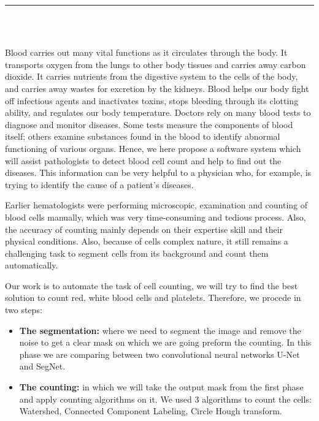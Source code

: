 \pagestyle{myfancy}


\setcounter{page}{1}

\begin{center}
    {\color{Black} \rule{6.2in}{1.4mm} }\\
    \vspace{0.1in}
    \scshape{\fontsize{34}{46}{\bfseries{\color{Black}{Introduction}}
    }}
    \\
    
    \vspace{0.5in}
\end{center}
\hspace*{0.16in}

Blood carries out many vital functions as it circulates through the body. It transports oxygen from the lungs to other body tissues and carries away carbon dioxide. It carries nutrients from the digestive system to the cells of the body, and carries away wastes for excretion by the kidneys. Blood helps our body fight off infectious agents and inactivates toxins, stops bleeding through its clotting ability, and regulates our body temperature. Doctors rely on many blood tests to diagnose and monitor diseases. Some tests measure the components of blood itself; others examine substances found in the blood to identify abnormal functioning of various organs. Hence, we here propose a software system which will assist pathologists to detect blood cell count and help to find out the diseases. This information can be very helpful to a physician who, for example, is trying to identify the cause of a patient's diseases.

Earlier hematologists were performing microscopic, examination and counting of blood cells manually, which was very time-consuming and tedious process. Also, the accuracy of counting mainly depends on their expertise skill and their physical conditions. Also, because of cells complex nature, it still remains a challenging task to segment cells from its background and count them automatically.

Our work is to automate the task of cell counting, we will try to find the best solution to count red, white blood cells and platelets. Therefore, we procede in two steps:
\begin{itemize}
    \item \textbf{The segmentation:} where we need to segment the image and remove the noise to get a clear mask on which we are going preform the counting. In this phase we are comparing between two convolutional neural networks U-Net and SegNet.
    \item \textbf{The counting:} in which we will take the output mask from the first phase and apply counting algorithms on it. We used 3 algorithms to count the cells: Watershed, Connected Component Labeling, Circle Hough transform.\
\end{itemize}

